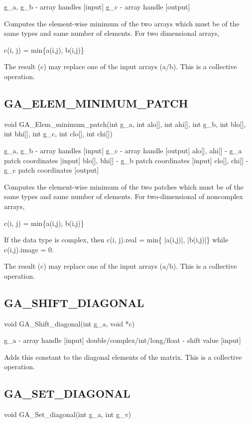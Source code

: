 g\_a, g\_b - array handles {[}input{]} g\_c - array handle {[}output{]}

Computes the element-wise minimum of the two arrays which must be
of the same types and same number of elements. For two dimensional
arrays,

c(i, j) = min\{a(i,j), b(i,j)\}

The result (c) may replace one of the input arrays (a/b). This is
a collective operation. 


\subsection*{GA\_ELEM\_MINIMUM\_PATCH}

void GA\_Elem\_minimum\_patch(int g\_a, int alo{[}{]}, int ahi{[}{]},
int g\_b, int blo{[}{]}, int bhi{[}{]}, int g\_c, int clo{[}{]}, int
chi{[}{]})

g\_a, g\_b - array handles {[}input{]} g\_c - array handle {[}output{]}
alo{[}{]}, ahi{[}{]} - g\_a patch coordinates {[}input{]} blo{[}{]},
bhi{[}{]} - g\_b patch coordinates {[}input{]} clo{[}{]}, chi{[}{]}
- g\_c patch coordinates {[}output{]}

Computes the element-wise minimum of the two patches which must be
of the same types and same number of elements. For two-dimensional
of noncomplex arrays,

c(i, j) = min\{a(i,j), b(i,j)\}

If the data type is complex, then c(i, j).real = min\{ |a(i,j)|, |b(i,j)|\}
while c(i,j).image = 0.

The result (c) may replace one of the input arrays (a/b). This is
a collective operation.


\subsection*{GA\_SHIFT\_DIAGONAL}

void GA\_Shift\_diagonal(int g\_a, void {*}c)

g\_a - array handle {[}input{]} double/complex/int/long/float - shift
value {[}input{]}

Adds this constant to the diagonal elements of the matrix. This is
a collective operation.


\subsection*{GA\_SET\_DIAGONAL}

void GA\_Set\_diagonal(int g\_a, int g\_v)

